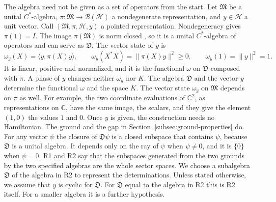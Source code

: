 \documentclass[11pt]{article}
\theoremstyle{definition}
\newcommand{\C}{\mathbb C}
\begin{document}
The algebra need not be given as a set of operators from the start. Let $\mathfrak M$ be a unital $C^*$-algebra, $\pi:\mathfrak M\to\mathcal B(\mathcal H)$ a nondegenerate representation, and $y\in\mathcal H$ a unit vector. Call $(\mathfrak M,\pi,\mathcal H,y)$ a pointed representation. Nondegeneracy gives $\pi(1)=I$. The image $\pi(\mathfrak M)$ is norm closed \cite{BratteliRobinson}, so it is a unital $C^*$-algebra of operators and can serve as $\mathfrak D$. The vector state of $y$ is
\begin{equation}
 \omega_y(X)=\langle y,\pi(X)y\rangle,\qquad
 \omega_y(X^*X)=\|\pi(X)y\|^2\geq0,\qquad
 \omega_y(1)=\|y\|^2=1 .
 \label{eq:pointed-vector-state}
\end{equation}
It is linear, positive and normalized, and it is the functional $\omega$ on $\mathfrak D$ composed with $\pi$. A phase of $y$ changes neither $\omega_y$ nor $K$. The algebra $\mathfrak D$ and the vector $y$ determine the functional $\omega$ and the space $K$. The vector state $\omega_y$ on $\mathfrak M$ depends on $\pi$ as well. For example, the two coordinate evaluations of $\C^2$, as representations on $\C$, have the same image, the scalars, and they give the element $(1,0)$ the values $1$ and $0$. Once $y$ is given, the construction needs no Hamiltonian. The ground and the gap in Section~\ref{subsec:ground-properties} do. For any vector $\psi$ the closure of $\mathfrak D\psi$ is a closed subspace that contains $\psi$, because $\mathfrak D$ is a unital algebra. It depends only on the ray of $\psi$ when $\psi\ne0$, and it is $\{0\}$ when $\psi=0$. R1 and R2 say that the subspaces generated from the two grounds by the two specified algebras are the whole sector spaces. We choose a subalgebra $\mathfrak D$ of the algebra in R2 to represent the determinations. Unless stated otherwise, we assume that $y$ is cyclic for $\mathfrak D$. For $\mathfrak D$ equal to the algebra in R2 this is R2 itself. For a smaller algebra it is a further hypothesis.
\end{document}
